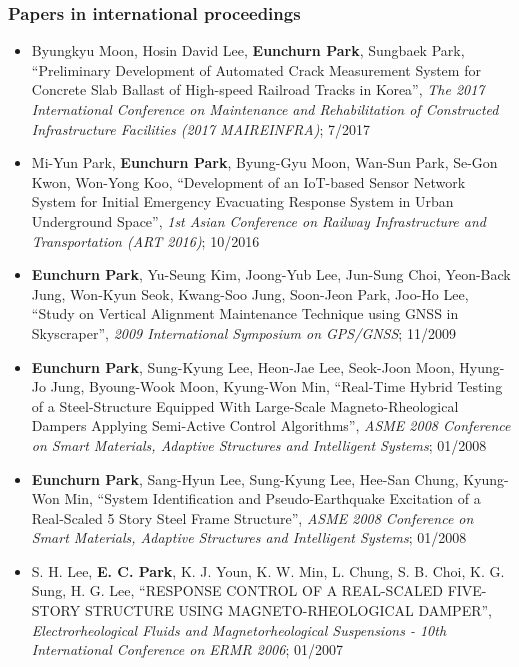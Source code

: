 \subsubsection*{Papers in international proceedings}
\begin{itemize}
\item[]
  Byungkyu Moon, Hosin David Lee, \textbf{Eunchurn Park}, Sungbaek Park, ``Preliminary Development of Automated Crack Measurement System for Concrete Slab Ballast of High-speed Railroad Tracks in Korea'', \emph{The 2017 International Conference on Maintenance and Rehabilitation of Constructed Infrastructure Facilities (2017 MAIREINFRA)}; 7/2017
\item[]
  Mi-Yun Park, \textbf{Eunchurn Park}, Byung-Gyu Moon, Wan-Sun Park, Se-Gon Kwon, Won-Yong Koo, ``Development of an IoT-based Sensor Network System for Initial Emergency Evacuating Response System in Urban Underground Space'', \emph{1st Asian Conference on Railway Infrastructure and Transportation (ART 2016)}; 10/2016
\item[]
  \textbf{Eunchurn Park}, Yu-Seung Kim, Joong-Yub Lee, Jun-Sung Choi,
  Yeon-Back Jung, Won-Kyun Seok, Kwang-Soo Jung, Soon-Jeon Park, Joo-Ho
  Lee, ``Study on Vertical Alignment Maintenance Technique using GNSS in
  Skyscraper'', \emph{2009 International Symposium on GPS/GNSS}; 11/2009
\item[]
  \textbf{Eunchurn Park}, Sung-Kyung Lee, Heon-Jae Lee, Seok-Joon Moon,
  Hyung-Jo Jung, Byoung-Wook Moon, Kyung-Won Min, ``Real-Time Hybrid
  Testing of a Steel-Structure Equipped With Large-Scale
  Magneto-Rheological Dampers Applying Semi-Active Control Algorithms'',
  \emph{ASME 2008 Conference on Smart Materials, Adaptive Structures and
  Intelligent Systems}; 01/2008
\item[]
  \textbf{Eunchurn Park}, Sang-Hyun Lee, Sung-Kyung Lee, Hee-San Chung,
  Kyung-Won Min, ``System Identification and Pseudo-Earthquake
  Excitation of a Real-Scaled 5 Story Steel Frame Structure'',
  \emph{ASME 2008 Conference on Smart Materials, Adaptive Structures and
  Intelligent Systems}; 01/2008
\item[]
  S. H. Lee, \textbf{E. C. Park}, K. J. Youn, K. W. Min, L. Chung, S. B.
  Choi, K. G. Sung, H. G. Lee, ``RESPONSE CONTROL OF A REAL-SCALED
  FIVE-STORY STRUCTURE USING MAGNETO-RHEOLOGICAL DAMPER'',
  \emph{Electrorheological Fluids and Magnetorheological Suspensions -
  10th International Conference on ERMR 2006}; 01/2007
\end{itemize}

